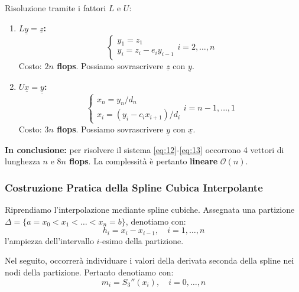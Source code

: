 Risoluzione tramite i fattori $L$ e $U$:
\begin{enumerate}
    \item \textbf{$L\underline{y} = \underline{z}$:}
    \begin{equation} \label{eq:15}
    \begin{cases} y_1 = z_1 \\ y_i = z_i - e_i y_{i-1} \end{cases} i=2, \dots, n
    \end{equation}
    Costo: \textbf{$2n$ flops}. Possiamo sovrascrivere $\underline{z}$ con $\underline{y}$.
    
    \item \textbf{$U\underline{x} = \underline{y}$:}
    \begin{equation} \label{eq:16}
    \begin{cases} x_n = y_n / d_n \\ x_i = (y_i - c_i x_{i+1}) / d_i \end{cases} i=n-1, \dots, 1
    \end{equation}
    Costo: \textbf{$3n$ flops}. Possiamo sovrascrivere $\underline{y}$ con $\underline{x}$.
\end{enumerate}

\textbf{In conclusione:} per risolvere il sistema \eqref{eq:12}-\eqref{eq:13} occorrono 4 vettori di lunghezza $n$ e \textbf{$8n$ flops}. La complessità è pertanto \textbf{lineare} $\mathcal{O}(n)$.











\vspace{1cm}
\subsubsection{Costruzione Pratica della Spline Cubica Interpolante}

Riprendiamo l'interpolazione mediante spline cubiche. Assegnata una partizione $\Delta = \{a = x_0 < x_1 < \dots < x_n = b\}$, denotiamo con:
$$h_i = x_i - x_{i-1}, \quad i=1, \dots, n$$
l'ampiezza dell'intervallo $i$-esimo della partizione.

Nel seguito, occorrerà individuare i valori della derivata seconda della spline nei nodi della partizione. Pertanto denotiamo con:
\begin{equation} \label{eq:mi_def}
m_i = S_3''(x_i), \quad i=0, \dots, n
\end{equation}


